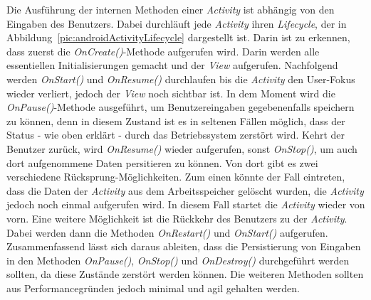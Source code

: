 Die Ausführung der internen Methoden einer \textit{Activity} ist abhängig von den Eingaben des Benutzers. Dabei durchläuft jede \textit{Activity} ihren \textit{Lifecycle}, der in Abbildung~\ref{pic:androidActivityLifecycle} dargestellt ist. Darin ist zu erkennen, dass zuerst die \textit{OnCreate()}-Methode aufgerufen wird. Darin werden alle essentiellen Initialisierungen gemacht und der \textit{View} aufgerufen. Nachfolgend werden \textit{OnStart()} und \textit{OnResume()} durchlaufen bis die \textit{Activity} den User-Fokus wieder verliert, jedoch der \textit{View} noch sichtbar ist. In dem Moment wird die \textit{OnPause()}-Methode ausgeführt, um Benutzereingaben gegebenenfalls speichern zu können, denn in diesem Zustand ist es in seltenen Fällen möglich, dass der Status - wie oben erklärt - durch das Betriebssystem zerstört wird. Kehrt der Benutzer zurück, wird \textit{OnResume()} wieder aufgerufen, sonst \textit{OnStop()}, um auch dort aufgenommene Daten persitieren zu können. Von dort gibt es zwei verschiedene Rücksprung-Möglichkeiten. Zum einen könnte der Fall eintreten, dass die Daten der \textit{Activity} aus dem Arbeitsspeicher gelöscht wurden, die \textit{Activity} jedoch noch einmal aufgerufen wird. In diesem Fall startet die \textit{Activity} wieder von vorn. Eine weitere Möglichkeit ist die Rückkehr des Benutzers zu der \textit{Activity}. Dabei werden dann die Methoden \textit{OnRestart()} und \textit{OnStart()} aufgerufen.\\
Zusammenfassend lässt sich daraus ableiten, dass die Persistierung von Eingaben in den Methoden \textit{OnPause()}, \textit{OnStop()} und \textit{OnDestroy()} durchgeführt werden sollten, da diese Zustände zerstört werden können. Die weiteren Methoden sollten aus Performancegründen jedoch minimal und agil gehalten werden.
